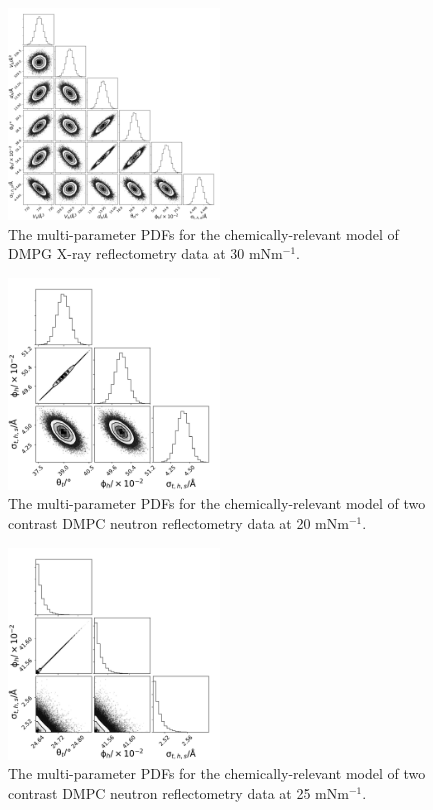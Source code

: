 \documentclass[11pt,a4paper]{paper}
\begin{document}
\begin{figure}[H]
	\centering
	\includegraphics[width=0.50\textwidth]{figures/dmpg4_all_corner}
	\caption{The multi-parameter PDFs for the chemically-relevant model of DMPG X-ray reflectometry data at 30 mNm$^{-1}$.}
	\label{fig:dmpg5}
\end{figure}
\begin{figure}[H]
	\centering
	\includegraphics[width=0.50\textwidth]{figures/dmpc_20n_all_corner}
	\caption{The multi-parameter PDFs for the chemically-relevant model of two contrast DMPC neutron reflectometry data at 20 mNm$^{-1}$.}
	\label{fig:dmpcn1}
\end{figure}
\begin{figure}[H]
	\centering
	\includegraphics[width=0.50\textwidth]{figures/dmpc_25n_all_corner}
	\caption{The multi-parameter PDFs for the chemically-relevant model of two contrast DMPC neutron reflectometry data at 25 mNm$^{-1}$.}
	\label{fig:dmpcn2}
\end{figure}
\end{document}
